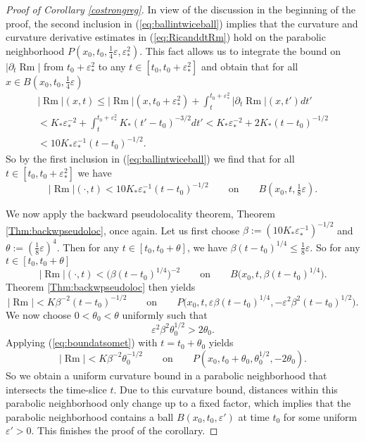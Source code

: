 \documentclass[11pt]{amsart}
\numberwithin{equation}{section}
\def\eps{\varepsilon}
\def\eps{\varepsilon}
\DeclareMathOperator{\Rm}{Rm}
\numberwithin{equation}{section}
\begin{document}
\begin{proof}[Proof of Corollary \ref{costrongreg}]
In view of the discussion in the beginning of the proof, the second inclusion in (\ref{eq:ballintwiceball}) implies that the curvature and curvature derivative estimates in (\ref{eq:RicanddtRm}) hold on the parabolic neighborhood $P(x_0, t_0, \frac14 \eps, \eps_*^2)$.
This fact allows us to integrate the bound on $|\partial_t {\Rm}|$ from $t_0 + \eps_*^2$ to any $t \in [t_0, t_0 + \eps_*^2]$ and obtain that for all $x \in B(x_0, t_0, \tfrac14 \eps)$
\begin{multline*}
 |{\Rm}| (x,t) \leq |{\Rm}| (x, t_0 + \eps_*^2) + \int_t^{t_0 + \eps_*^2} |\partial_t {\Rm}| (x, t') dt' \\
 < K_* \eps_*^{-2}  + \int_t^{t_0 + \eps_*^2}K_* (t'-t_0)^{-3/2} dt'
 < K_* \eps_*^{-2}  + 2 K_* (t - t_0)^{-1/2} \\
 < 10 K_* \eps_*^{-1}  (t-t_0)^{-1/2}.
\end{multline*}
So by the first inclusion in (\ref{eq:ballintwiceball}) we find that for all $t \in [t_0, t_0 + \eps_*^2]$ we have
\[ |{\Rm}| (\cdot, t) < 10 K_* \eps_*^{-1}  (t-t_0)^{-1/2} \qquad \text{on} \qquad B(x_0, t, \tfrac18 \eps ). \]

We now apply the backward pseudolocality theorem, Theorem \ref{Thm:backwpseudoloc}, once again.
Let us first choose $\beta := (10 K_* \eps_*^{-1} )^{-1/2}$ and $\theta := (\frac18 \eps)^4$.
Then for any $t \in [t_0, t_0 + \theta ]$, we have $\beta  (t-t_0)^{1/4} \leq \frac18 \eps$.
So for any $t \in [t_0, t_0 + \theta ]$
\[ |{\Rm}| (\cdot, t) < \big( \beta (t-t_0)^{1/4} \big)^{-2} \qquad \text{on} \qquad B \big( x_0, t, \beta  (t-t_0)^{1/4} \big). \]
Theorem \ref{Thm:backwpseudoloc} then yields
\begin{equation} \label{eq:boundatsomet}
 |{\Rm}| < K \beta^{-2}  (t-t_0)^{-1/2} \qquad \text{on} \qquad P \big( x_0, t, \eps \beta  (t-t_0)^{1/4}, - \eps^2 \beta^2  (t-t_0)^{1/2} \big).
\end{equation}
We now choose $0 < \theta_0 < \theta$ uniformly such that
\[  \eps^2 \beta^2 \theta_0^{1/2} > 2 \theta_0. \]
Applying (\ref{eq:boundatsomet}) with $t = t_0 + \theta_0$ yields
\[ |{\Rm}| < K \beta^{-2} \theta_0^{-1/2}  \qquad \text{on} \qquad P(x_0, t_0 + \theta_0 , \theta_0^{1/2}, - 2 \theta_0 ). \]
So we obtain a uniform curvature bound in a parabolic neighborhood that intersects the time-slice $t$.
Due to this curvature bound, distances within this parabolic neighborhood only change up to a fixed factor, which implies that the parabolic neighborhood contains a ball $B(x_0, t_0, \varepsilon')$ at time $t_0$ for some uniform $\varepsilon' > 0$.
This finishes the proof of the corollary. 
\end{proof}
\end{document}
